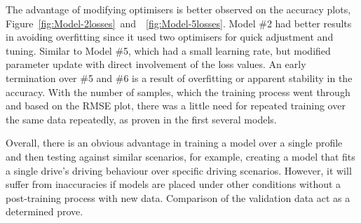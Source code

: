%
%
The advantage of modifying optimisers is better observed on the accuracy plots, \mbox{Figure~\ref{fig:Model-2losses} and ~\ref{fig:Model-5losses}}.
Model \#2 had better results in avoiding overfitting since it used two optimisers for quick adjustment and tuning.
Similar to Model \#5, which had a small learning rate, but modified parameter update with direct involvement of the loss values.
An early termination over \#5 and \#6 is a result of overfitting or apparent stability in the accuracy.
With the number of samples, which the training process went through and based on the RMSE plot, there was a little need for repeated training over the same data repeatedly, as proven in the first several models.

%
%
Overall, there is an obvious advantage in training a model over a single profile and then testing against similar scenarios, for example, creating a model that fits a single drive's driving behaviour over specific driving scenarios.
However, it will suffer from inaccuracies if models are placed under other conditions without a post-training process with new data.
Comparison of the validation data act as a determined prove.
